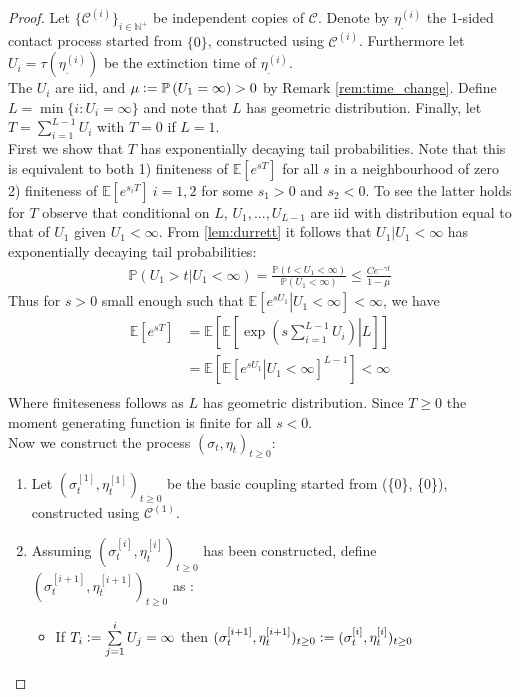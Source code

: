 \documentclass{article}
\theoremstyle{slimTheoremStyle} %
\theoremstyle{slimDefinitionStyle}
\theoremstyle{remark}
\renewcommand{\cal}[1]{\mathcal{#1}}
\newcommand{\N}{\mathbb{N}}
\newcommand{\Ex}[1]{\mathbb{E}\left[ #1 \right]}
\newcommand{\ExCond}[2]{\mathbb{E} \left[\left. #1 \right| #2 \right]}
\renewcommand{\Pr}[1]{\mathbb{P} \left( #1 \right)}
\newcommand{\defeq}{\vcentcolon=}
\begin{document}
\begin{proof}
Let $\{ \cal{C}^{(i)}\}_{i \in \N^+}$ be independent copies of $\cal{C}$. Denote by $\eta^{(i)}_.$ the 1-sided contact process started from $\{0\}$, constructed using $\cal{C}^{(i)}$. Furthermore let $U_i = \tau(\eta^{(i)}_.)$ be the extinction time of $\eta^{(i)}_.$. \\
The $U_i$ are iid, and $\mu \defeq \Pr{U_1 = \infty} > 0$ by Remark \ref{rem:time_change}. Define $L = \min \{ i: U_i = \infty \}$ and note that $L$ has geometric distribution. Finally, let $T = \sum\limits^{L-1}_{i=1} U_i$ with $T=0$ if $L=1$. \\
First we show that $T$ has exponentially decaying tail probabilities. Note that this is equivalent to both 1) finiteness of $\Ex{e^{sT}}$ for all $s$ in a neighbourhood of zero 2) finiteness of $\Ex{e^{s_i T}}\ i=1,2$ for some $s_1 > 0$ and $s_2 < 0$. To see the latter holds for $T$ observe that conditional on $L$, $U_1, ..., U_{L-1}$ are iid with distribution equal to that of $U_1$ given $U_1 < \infty$. From \ref{lem:durrett} it follows that $U_1 | U_1 < \infty$ has exponentially decaying tail probabilities:
\begin{align*}
\Pr{U_1 > t | U_1 < \infty} = \frac{\Pr{t < U_1 < \infty}}{\Pr{U_1 < \infty}} \leq \frac{C e^{- \gamma t}}{1 - \mu}
\end{align*}
Thus for $s > 0$ small enough such that $\ExCond{e^{sU_1}}{U_1 < \infty} < \infty$, we have
\begin{align*}
\Ex{e^{sT}} &= \Ex{\ExCond{\exp\left(s\sum\limits_{i=1}^{L-1} U_i \right)}{L}} \\
            &= \Ex{\ExCond{e^{s U_1}}{U_1 < \infty}^{L-1}} < \infty \\
\end{align*}
Where finiteseness follows as $L$ has geometric distribution. Since $T \geq 0$ the moment generating function is finite for all $s < 0$. \\
Now we construct the process $(\sigma_t, \eta_t)_{t \geq 0}$:
\begin{enumerate}
  \item Let $(\sigma^{[1]}_t, \eta^{[1]}_t)_{t \geq 0}$ be the basic coupling started from (\{0\}, \{0\}), constructed using $\cal{C}^{(1)}$. 
  \item Assuming $(\sigma^{[i]}_t, \eta^{[i]}_t)_{t \geq 0}$ has been constructed, define $(\sigma^{[i+1]}_t, \eta^{[i+1]}_t)_{t \geq 0}$ as :
  \begin{itemize}
    \item If $T_i \defeq \sum\limits^i_{j=1} U_j = \infty$ then $(\sigma^{[i+1]}_t, \eta^{[i+1]}_t)_{t \geq 0} \defeq (\sigma^{[i]}_t, \eta^{[i]}_t)_{t \geq 0}$

\end{itemize}
\end{enumerate}
\end{proof}
\end{document}
